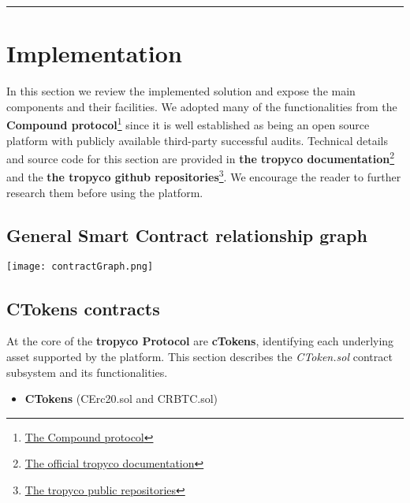 \documentclass{article}
\begin{document}
\begin{center}
\noindent\rule{8cm}{0.4pt}
\end{center}

\section{Implementation}
In this section we review the implemented solution and expose the main components and their facilities. We adopted many of the functionalities from the \textbf{Compound protocol}\footnote{\href{https://github.com/compound-finance/compound-protocol}{The Compound protocol}} since it is well established as being an open source platform with publicly available third-party successful audits. Technical details and source code for this section are provided in \textbf{the tropyco documentation}\footnote{\href{https://tropyco.app/docs}{The official tropyco documentation}} and the \textbf{the tropyco github repositories}\footnote{\href{https://github.com/riflending/}{The tropyco public repositories}}. We encourage the reader to further research them before using the platform.

\subsection{General Smart Contract relationship graph}
\begin{center}
\texttt{[image: contractGraph.png]}
\end{center}

\subsection{CTokens contracts}
At the core of the \textbf{tropyco Protocol} are \textbf{cTokens}, identifying each underlying asset supported by the platform.
This section describes the \textit{CToken.sol} contract subsystem and its functionalities.

\begin{itemize}
\item{\textbf{CTokens}} (CErc20.sol and CRBTC.sol)
\end{itemize}
\end{document}

